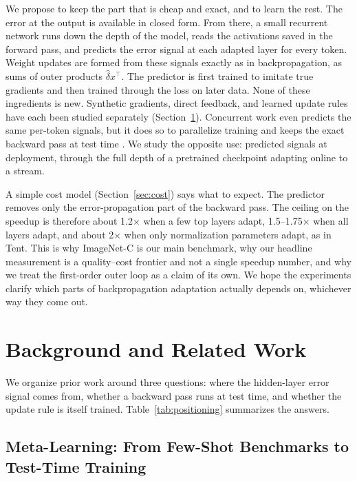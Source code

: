 \documentclass{article}
\newcommand{\deltahat}{\hat{\delta}}
\begin{document}
We propose to keep the part that is cheap and exact, and to learn the rest. The
error at the output is available in closed form. From there, a small recurrent
network runs down the depth of the model, reads the activations saved in the
forward pass, and predicts the error signal at each adapted layer for every
token. Weight updates are formed from these signals exactly as in
backpropagation, as sums of outer products $\deltahat x^\top$. The predictor is
first trained to imitate true gradients and then trained through the loss on
later data. None of these ingredients is new. Synthetic gradients, direct
feedback, and learned update rules have each been studied separately
(Section~\ref{sec:related}). Concurrent work even predicts the same per-token
signals, but it does so to parallelize training and keeps the exact backward
pass at test time \parencite{liu2026gradlev}. We study the opposite use:
predicted signals at deployment, through the full depth of a pretrained
checkpoint adapting online to a stream.

A simple cost model (Section~\ref{sec:cost}) says what to expect. The predictor
removes only the error-propagation part of the backward pass. The ceiling on
the speedup is therefore about 1.2$\times$ when a few top layers adapt,
1.5--1.75$\times$ when all layers adapt, and about 2$\times$ when only
normalization parameters adapt, as in Tent. This is why ImageNet-C is our main
benchmark, why our headline measurement is a quality--cost frontier and not a
single speedup number, and why we treat the first-order outer loop as a claim
of its own. We hope the experiments clarify which parts of backpropagation
adaptation actually depends on, whichever way they come out.

\section{Background and Related Work}
\label{sec:related}

We organize prior work around three questions: where the hidden-layer error
signal comes from, whether a backward pass runs at test time, and whether the
update rule is itself trained. Table~\ref{tab:positioning} summarizes the
answers.

\subsection{Meta-Learning: From Few-Shot Benchmarks to Test-Time Training}
\end{document}
